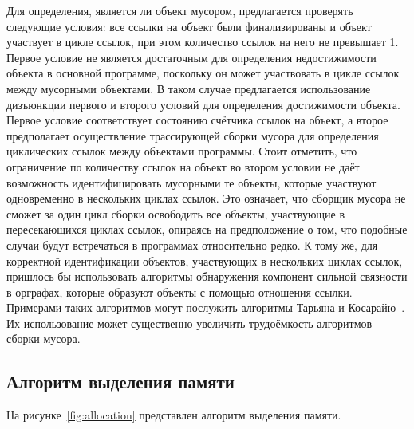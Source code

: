 Для определения, является ли объект мусором, предлагается проверять следующие условия: все ссылки на объект были финализированы и объект участвует в цикле ссылок, при этом количество ссылок на него не превышает 1. Первое условие не является достаточным для определения недостижимости объекта в основной программе, поскольку он может участвовать в цикле ссылок между мусорными объектами. В таком случае предлагается использование дизъюнкции первого и второго условий для определения достижимости объекта. Первое условие соответствует состоянию счётчика ссылок на объект, а второе предполагает осуществление трассирующей сборки мусора для определения циклических ссылок между объектами программы. Стоит отметить, что ограничение по количеству ссылок на объект во втором условии не даёт возможность идентифицировать мусорными те объекты, которые участвуют одновременно в нескольких циклах ссылок. Это означает, что сборщик мусора не сможет за один цикл сборки освободить все объекты, участвующие в пересекающихся циклах ссылок, опираясь на предположение о том, что подобные случаи будут встречаться в программах относительно редко. К тому же, для корректной идентификации объектов, участвующих в нескольких циклах ссылок, пришлось бы использовать алгоритмы обнаружения компонент сильной связности в орграфах, которые образуют объекты с помощью отношения ссылки. Примерами таких алгоритмов могут послужить алгоритмы Тарьяна и Косарайю~\cite{graph_algorithms}. Их использование может существенно увеличить трудоёмкость алгоритмов сборки мусора.

\subsection{Алгоритм выделения памяти}

На рисунке~\ref{fig:allocation} представлен алгоритм выделения памяти.


